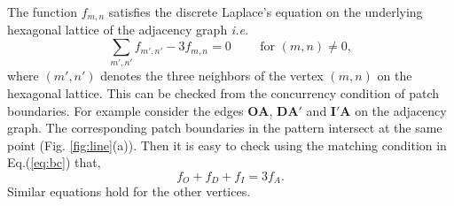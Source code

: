 \documentclass[11pt,a4paper]{book}
\begin{document}
The function $f_{m,n}$ satisfies the discrete Laplace's equation on the underlying hexagonal lattice
of the adjacency graph \textit{i.e.}
\begin{equation}
\sum_{m',n'}f_{m',n'}-3f_{m,n}=0 \textrm{ ~ ~ ~  for }\left( m,n \right)\ne 0,
\label{laplace}
\end{equation}
where $\left( m', n' \right)$ denotes the three neighbors of the vertex $\left(m,n\right)$ on the hexagonal lattice.
This can be checked from the concurrency condition of patch boundaries. For
example consider the edges $\mathbf{OA}$, $\mathbf{DA'}$ and
$\mathbf{I'A}$ on the adjacency graph. The corresponding patch boundaries in the
pattern intersect at the same point (Fig. \ref{fig:line}(a)).
Then it is easy to check using the matching condition in
Eq.(\ref{eq:bc}) that,
\begin{equation}
f_{O}+f_{D}+f_{I}=3f_{A}.
\end{equation}
Similar equations hold for the other vertices.
\end{document}
